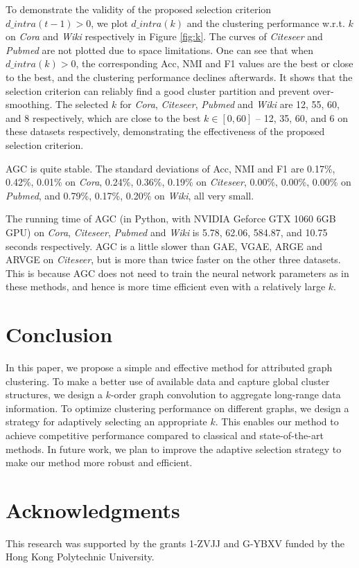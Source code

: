 \documentclass{article}
\begin{document}
To demonstrate the validity of the proposed selection criterion $d\_intra(t-1)>0$, we plot $d\_intra(k)$ and the clustering performance w.r.t. $k$ on \emph{Cora} and \emph{Wiki} respectively in Figure \ref{fig:k}. The curves of \emph{Citeseer} and \emph{Pubmed} are not plotted due to space limitations. One can see that when $d\_intra(k)>0$, the corresponding Acc, NMI and F1 values are the best or close to the best, and the clustering performance declines afterwards. It shows that the selection criterion can reliably find a good cluster partition and prevent over-smoothing. The selected $k$ for \emph{Cora}, \emph{Citeseer}, \emph{Pubmed} and \emph{Wiki} are 12, 55, 60, and 8 respectively, which are close to the best $k\in [0, 60]$ -- 12, 35, 60, and 6 on these datasets respectively, demonstrating the effectiveness of the proposed selection criterion.

AGC is quite stable. The standard deviations of Acc, NMI and F1 are 0.17\%, 0.42\%, 0.01\% on \emph{Cora}, 0.24\%, 0.36\%, 0.19\% on \emph{Citeseer}, 0.00\%, 0.00\%, 0.00\% on \emph{Pubmed}, and 0.79\%, 0.17\%, 0.20\% on \emph{Wiki}, all very small.


The running time of AGC (in Python, with NVIDIA Geforce GTX 1060 6GB GPU) on \emph{Cora}, \emph{Citeseer}, \emph{Pubmed} and \emph{Wiki} is 5.78, 62.06, 584.87, and 10.75 seconds respectively. AGC is a little slower than GAE, VGAE, ARGE and ARVGE on \emph{Citeseer}, but is more than twice faster on the other three datasets. This is because AGC does not need to train the neural network parameters as in these methods, and hence is more time efficient even with a relatively large $k$. 


 

\section{Conclusion}

In this paper, we propose a simple and effective method for attributed graph clustering. To make a better use of available data and capture global cluster structures, we design a $k$-order graph convolution to aggregate long-range data information. To optimize clustering performance on different graphs, we design a strategy for adaptively selecting an appropriate $k$. This enables our method to achieve competitive performance compared to classical and state-of-the-art methods.
In future work, we plan to improve the adaptive selection strategy to make our method more robust and efficient.

 \section*{Acknowledgments}

This research was supported by the grants 1-ZVJJ and G-YBXV funded by the Hong Kong Polytechnic University.
 










\end{document}
